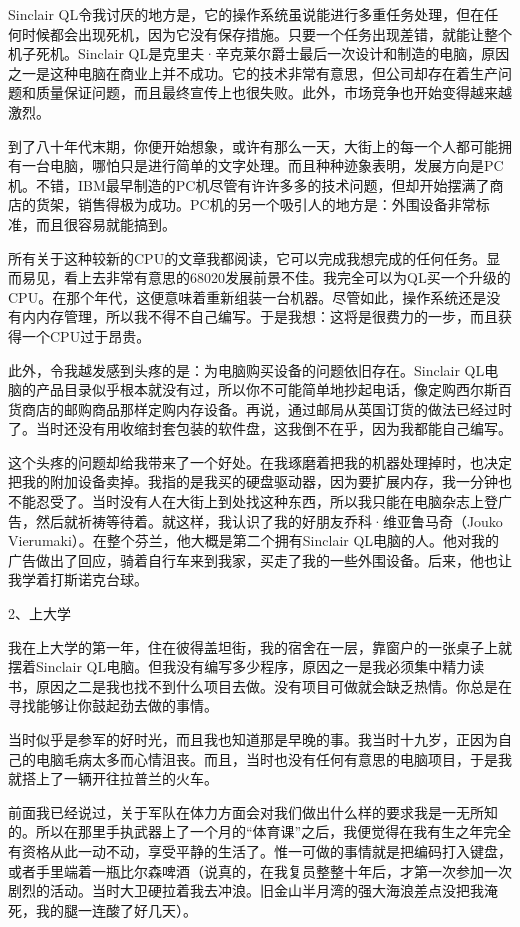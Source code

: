 Sinclair QL令我讨厌的地方是，它的操作系统虽说能进行多重任务处理，但在任何时候都会出现死机，因为它没有保存措施。只要一个任务出现差错，就能让整个机子死机。Sinclair QL是克里夫·辛克莱尔爵士最后一次设计和制造的电脑，原因之一是这种电脑在商业上并不成功。它的技术非常有意思，但公司却存在着生产问题和质量保证问题，而且最终宣传上也很失败。此外，市场竞争也开始变得越来越激烈。

到了八十年代末期，你便开始想象，或许有那么一天，大街上的每一个人都可能拥有一台电脑，哪怕只是进行简单的文字处理。而且种种迹象表明，发展方向是PC机。不错，IBM最早制造的PC机尽管有许许多多的技术问题，但却开始摆满了商店的货架，销售得极为成功。PC机的另一个吸引人的地方是：外围设备非常标准，而且很容易就能搞到。

所有关于这种较新的CPU的文章我都阅读，它可以完成我想完成的任何任务。显而易见，看上去非常有意思的68020发展前景不佳。我完全可以为QL买一个升级的CPU。在那个年代，这便意味着重新组装一台机器。尽管如此，操作系统还是没有内内存管理，所以我不得不自己编写。于是我想：这将是很费力的一步，而且获得一个CPU过于昂贵。

此外，令我越发感到头疼的是：为电脑购买设备的问题依旧存在。Sinclair QL电脑的产品目录似乎根本就没有过，所以你不可能简单地抄起电话，像定购西尔斯百货商店的邮购商品那样定购内存设备。再说，通过邮局从英国订货的做法已经过时了。当时还没有用收缩封套包装的软件盘，这我倒不在乎，因为我都能自己编写。

这个头疼的问题却给我带来了一个好处。在我琢磨着把我的机器处理掉时，也决定把我的附加设备卖掉。我指的是我买的硬盘驱动器，因为要扩展内存，我一分钟也不能忍受了。当时没有人在大街上到处找这种东西，所以我只能在电脑杂志上登广告，然后就祈祷等待着。就这样，我认识了我的好朋友乔科·维亚鲁马奇（Jouko Vierumaki）。在整个芬兰，他大概是第二个拥有Sinclair QL电脑的人。他对我的广告做出了回应，骑着自行车来到我家，买走了我的一些外围设备。后来，他也让我学着打斯诺克台球。

 
2、上大学

我在上大学的第一年，住在彼得盖坦街，我的宿舍在一层，靠窗户的一张桌子上就摆着Sinclair QL电脑。但我没有编写多少程序，原因之一是我必须集中精力读书，原因之二是我也找不到什么项目去做。没有项目可做就会缺乏热情。你总是在寻找能够让你鼓起劲去做的事情。

当时似乎是参军的好时光，而且我也知道那是早晚的事。我当时十九岁，正因为自己的电脑毛病太多而心情沮丧。而且，当时也没有任何有意思的电脑项目，于是我就搭上了一辆开往拉普兰的火车。

前面我已经说过，关于军队在体力方面会对我们做出什么样的要求我是一无所知的。所以在那里手执武器上了一个月的“体育课”之后，我便觉得在我有生之年完全有资格从此一动不动，享受平静的生活了。惟一可做的事情就是把编码打入键盘，或者手里端着一瓶比尔森啤酒（说真的，在我复员整整十年后，才第一次参加一次剧烈的活动。当时大卫硬拉着我去冲浪。旧金山半月湾的强大海浪差点没把我淹死，我的腿一连酸了好几天）。

